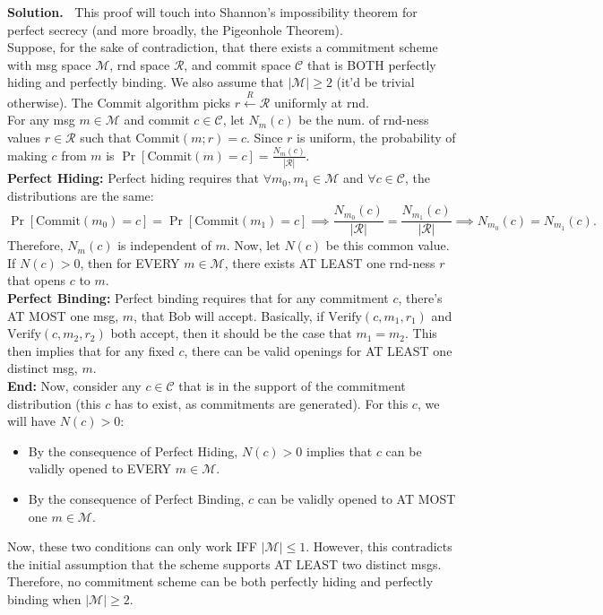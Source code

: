 \documentclass[12pt]{article}
\theoremstyle{definition}
\newcommand{\addbigskip}{\addvspace{\bigskipamount}}
\newenvironment{solution}
     {\addbigskip
      \noindent\color{blue}\textbf{Solution.\ }}
     {\par\addbigskip}
\newenvironment{solution}
     {\comment}
     {\endcomment}
\newcommand{\M}{\mathcal{M}}
\newcommand{\C}{\mathcal{C}}
\begin{document}
\begin{solution}
This proof will touch into Shannon's impossibility theorem for perfect secrecy (and more broadly, the Pigeonhole Theorem).\\

\noindent Suppose, for the sake of contradiction, that there exists a commitment scheme with msg space $\M$, rnd space $\mathcal{R}$, 
and commit space $\C$ that is BOTH perfectly hiding and perfectly binding.
We also assume that $|\M| \ge 2$ (it'd be trivial otherwise).
The Commit algorithm picks $r \xleftarrow{R} \mathcal{R}$ uniformly at rnd.\\

\noindent For any msg $m \in \M$ and commit $c \in \C$, let $N_m(c)$ be the num. of rnd-ness values $r \in \mathcal{R}$ such that $\text{Commit}(m; r) = c$.
Since $r$ is uniform, the probability of making $c$ from $m$ is $\Pr[\text{Commit}(m) = c] = \frac{N_m(c)}{|\mathcal{R}|}$.\\

\noindent\textbf{Perfect Hiding:}
Perfect hiding requires that $\forall m_0, m_1 \in \M$ and $\forall c \in \C$, the distributions are the same:
\[
\Pr[\text{Commit}(m_0) = c] = \Pr[\text{Commit}(m_1) = c] \implies \frac{N_{m_0}(c)}{|\mathcal{R}|} = \frac{N_{m_1}(c)}{|\mathcal{R}|} \implies N_{m_0}(c) = N_{m_1}(c).
\]
Therefore, $N_m(c)$ is independent of $m$.
Now, let $N(c)$ be this common value.
If $N(c) > 0$, then for EVERY $m \in \M$, there exists AT LEAST one rnd-ness $r$ that opens $c$ to $m$.\\

\noindent\textbf{Perfect Binding:}
Perfect binding requires that for any commitment $c$, there's AT MOST one msg, $m$, that Bob will accept.
Basically, if $\text{Verify}(c, m_1, r_1)$ and $\text{Verify}(c, m_2, r_2)$ both accept, then it should be the case that $m_1 = m_2$.
This then implies that for any fixed $c$, there can be valid openings for AT LEAST one distinct msg, $m$.\\

\noindent\textbf{End:} Now, consider any $c \in \C$ that is in the support of the commitment distribution (this $c$ has to exist, as commitments are generated).
For this $c$, we will have $N(c) > 0$:
\begin{itemize}
  \item By the consequence of Perfect Hiding, $N(c) > 0$ implies that $c$ can be validly opened to EVERY $m \in \M$. 
  \item By the consequence of Perfect Binding, $c$ can be validly opened to AT MOST one $m \in \M$.
\end{itemize}
Now, these two conditions can only work IFF $|\M| \le 1$.
However, this contradicts the initial assumption that the scheme supports AT LEAST two distinct msgs. \\

\noindent Therefore, no commitment scheme can be both perfectly hiding and perfectly binding when $|\M| \ge 2$.
\end{solution}
\end{document}
